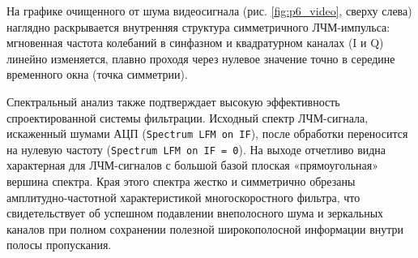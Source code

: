 На графике очищенного от шума видеосигнала (рис. \ref{fig:p6_video}, сверху слева) наглядно раскрывается внутренняя структура симметричного ЛЧМ-импульса: мгновенная частота колебаний в синфазном и квадратурном каналах (I и Q) линейно изменяется, плавно проходя через нулевое значение точно в середине временного окна (точка симметрии).

Спектральный анализ также подтверждает высокую эффективность спроектированной системы фильтрации. Исходный спектр ЛЧМ-сигнала, искаженный шумами АЦП (\texttt{Spectrum LFM on IF}), после обработки переносится на нулевую частоту (\texttt{Spectrum LFM on IF = 0}). На выходе отчетливо видна характерная для ЛЧМ-сигналов с большой базой плоская «прямоугольная» вершина спектра. Края этого спектра жестко и симметрично обрезаны амплитудно-частотной характеристикой многоскоростного фильтра, что свидетельствует об успешном подавлении внеполосного шума и зеркальных каналов при полном сохранении полезной широкополосной информации внутри полосы пропускания.